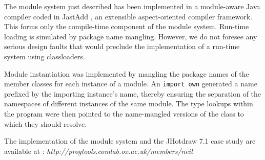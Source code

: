 The module system just described has been implemented in a
module-aware Java compiler coded in JastAdd \cite{jastadd},
an extensible aspect-oriented compiler framework. This forms
only the compile-time component of the module system. Run-time
loading is simulated by package name mangling. However,
we do not foresee any serious design faults that would preclude
the implementation of a run-time system using classloaders.

Module instantiation was implemented by mangling
the package names of the member classes for each instance of 
a module. An \texttt{import own} generated a name prefixed by 
the importing instance's name, thereby ensuring the separation
of the namespaces of different instances of the same module.
The type lookups within the program were then pointed to the
name-mangled versions of the class to which they should resolve.

The implementation of the module system and the 
JHotdraw 7.1 case study are available at : 
\textit{http://progtools.comlab.ox.ac.uk/members/neil}

